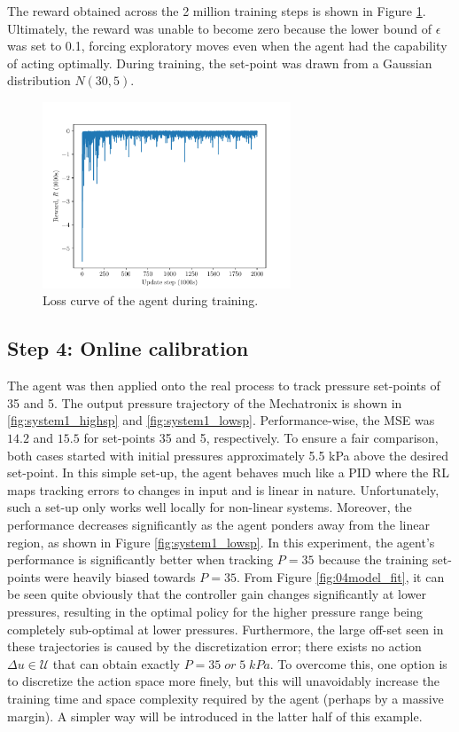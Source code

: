 The reward obtained across the 2 million training steps is shown in Figure \ref{fig:loss_curve}. Ultimately, the reward was unable to become zero because the lower bound of $\epsilon$ was set to 0.1, forcing exploratory moves even when the agent had the capability of acting optimally. During training, the set-point was drawn from a Gaussian distribution $N(30, 5)$. 
\begin{figure}[H]
    \centering
    \includegraphics[width=0.66\textwidth]{images/ch4/loss_curve.pdf}
    \caption{Loss curve of the agent during training.}
    \label{fig:loss_curve}
\end{figure}

\subsection{Step 4: Online calibration}

The agent was then applied onto the real process to track pressure set-points of 35 and 5.  The output pressure trajectory of the Mechatronix is shown in \ref{fig:system1_highsp} and \ref{fig:system1_lowsp}. Performance-wise, the MSE was $14.2$ and $15.5$ for set-points 35 and 5, respectively. To ensure a fair comparison, both cases started with initial pressures approximately 5.5 kPa above the desired set-point. In this simple set-up, the agent behaves much like a PID where the RL maps tracking errors to changes in input and is linear in nature. Unfortunately, such a set-up only works well locally for non-linear systems. Moreover, the performance decreases significantly as the agent ponders away from the linear region, as shown in Figure \ref{fig:system1_lowsp}. In this experiment, the agent's performance is significantly better when tracking $P=35$ because the training set-points were heavily biased towards $P=35$.  From Figure \ref{fig:04model_fit}, it can be seen quite obviously that the controller gain changes significantly at lower pressures, resulting in the optimal policy for the higher pressure range being completely sub-optimal at lower pressures. Furthermore, the large off-set seen in these trajectories is caused by the discretization error; there exists no action $\Delta u \in \mathcal{U}$ that can obtain exactly $P = 35 \; or \; 5 \; kPa$. To overcome this, one option is to discretize the action space more finely, but this will unavoidably increase the training time and space complexity required by the agent (perhaps by a massive margin).  A simpler way will be introduced in the latter half of this example.

